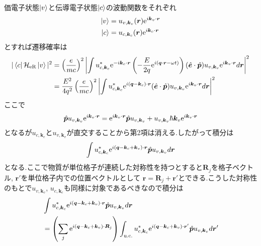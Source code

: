 \documentclass[uplatex,a4j,11pt,dvipdfmx]{jsarticle}
\begin{document}
価電子状態$\ket{v}$と伝導電子状態$\ket{c}$の波動関数をそれぞれ
\begin{align}
  \ket{v}&=u_{v,{\bm k}_v}({\bm r}){\rm e}^{i{\bm k}_v\cdot{\bm r}}\\
  \ket{c}&=u_{c,{\bm k}_c}({\bm r}){\rm e}^{i{\bm k}_c\cdot{\bm r}}
\end{align}
とすれば遷移確率は
\begin{align}
  \begin{split}
    |\bra{c}\mathcal{H}_{\rm eR}\ket{v}|^2
    &=\left(\frac{e}{mc}\right)^2\left|\int u_{c,{\bm k}_c}^*{\rm e}^{-i{\bm k}_c\cdot{\bm r}}\left(-\frac{E}{2q}{\rm e}^{i({\bm q}\cdot{\bm r}-\omega t)}\right)
    (\hat{\bm e}\cdot\hat{\bm p})u_{v,{\bm k}_v}{\rm e}^{i{\bm k}_v\cdot{\bm r}}d{\bm r}
    \right|^2\\
    &=\frac{E^2}{4q^2}\left(\frac{e}{mc}\right)^2\left|\int u_{c,{\bm k}_c}^*{\rm e}^{i({\bm q}-{\bm k}_c)\cdot{\bm r}}
    (\hat{\bm e}\cdot\hat{\bm p})u_{v,{\bm k}_v}{\rm e}^{i{\bm k}_v\cdot{\bm r}}d{\bm r}
    \right|^2
  \end{split}
\end{align}
ここで
\begin{align}
  \hat{\bm p}u_{v,{\bm k}_v}{\rm e}^{i{\bm k}_v\cdot{\bm r}}={\rm e}^{i{\bm k}_v\cdot{\bm r}}\hat{\bm p}u_{v,{\bm k}_v}
  +u_{v,{\bm k}_v}\hbar{\bm k}_v{\rm e}^{i{\bm k}_v\cdot{\bm r}}
\end{align}
となるが$u_{c,{\bm k}_c}$と$u_{v,{\bm k}_v}$が直交することから第2項は消える.したがって積分は
\begin{align}
  \int u_{c,{\bm k}_c}^*{\rm e}^{i({\bm q}-{\bm k}_c+{\bm k}_v)\cdot{\bm r}}\hat{\bm p}u_{v,{\bm k}_v}d{\bm r}
\end{align}
となる.ここで物質が単位格子が連続した対称性を持つとすると${\bm R}_j$を格子ベクトル, ${\bm r}'$を単位格子内での位置ベクトルとして
${\bm r}={\bm R}_j+{\bm r}'$とできる.こうした対称性のもとで$u_{v,{\bm k}_v}$, $u_{c,{\bm k}_c}$も同様に対象であるべきなので積分は
\begin{align}
  \begin{split}
    \label{equ:integral_lattice_r}
    &\int u_{c,{\bm k}_c}^*{\rm e}^{i({\bm q}-{\bm k}_c+{\bm k}_v)\cdot{\bm r}}\hat{\bm p}u_{v,{\bm k}_v}d{\bm r}\\
    &=\left(\sum_j{\rm e}^{i({\bm q}-{\bm k}_c+{\bm k}_v)\cdot{\bm R}_j}\right)\int_{\rm u.c.} u_{c,{\bm k}_c}^*{\rm e}^{i({\bm q}-{\bm k}_c+{\bm k}_v)\cdot{\bm r}'}\hat{\bm p}u_{v,{\bm k}_v}d{\bm r}'
  \end{split}
\end{align}
\end{document}
